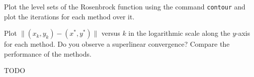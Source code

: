 \documentclass{../kin_math}
\begin{document}
\begin{questions}
\begin{enumerate}
    Plot the level sets of the Rosenbrock function using the command \texttt{contour} and plot the iterations for each method over it.

    Plot $\lVert (x_k, y_k) - (x^*, y^*) \rVert$ versus $k$ in the logarithmic scale along the $y$-axis for each method. Do you observe a superlinear convergence? Compare the performance of the methods.
    \begin{solution}
      TODO
    \end{solution}
  \end{enumerate}
\end{questions}
\end{document}
